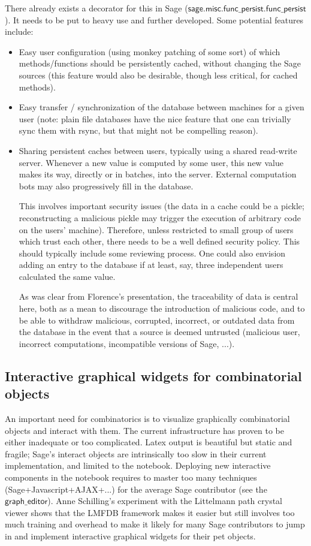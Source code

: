 \documentclass{article}
\newcommand{\sagecommand}[1]{$\textsf{#1}$}
\begin{document}
There already exists a decorator for this in Sage
(\sagecommand{sage.misc.func\_persist.func\_persist}). It needs to be put to heavy use
and further developed. Some potential features include:
\begin{itemize}
\item Easy user configuration (using monkey patching of some sort) of
  which methods/functions should be persistently cached, without
  changing the Sage sources (this feature would also be desirable,
  though less critical, for cached methods).
\item Easy transfer / synchronization of the database between machines
  for a given user (note: plain file databases have the nice feature
  that one can trivially sync them with rsync, but that might not be
  compelling reason).
\item Sharing persistent caches between users, typically using a
  shared read-write server. Whenever a new value is computed by some
  user, this new value makes its way, directly or in batches, into the
  server. External computation bots may also progressively fill in the
  database.

  This involves important security issues (the data in a cache could be a
  pickle; reconstructing a malicious pickle may trigger the execution
  of arbitrary code on the users' machine). Therefore, unless
  restricted to small group of users which trust each other, there
  needs to be a well defined security policy. This should typically
  include some reviewing process. One could also envision adding an
  entry to the database if at least, say, three independent users
  calculated the same value.

  As was clear from Florence's presentation, the traceability of data
  is central here, both as a mean to discourage the introduction of
  malicious code, and to be able to withdraw malicious, corrupted,
  incorrect, or outdated data from the database in the event that a
  source is deemed untrusted (malicious user, incorrect computations,
  incompatible versions of Sage, ...).
\end{itemize}

\subsection{Interactive graphical widgets for combinatorial objects}

An important need for combinatorics is to visualize graphically
combinatorial objects and interact with them. The current
infrastructure has proven to be either inadequate or too complicated. 
Latex output is beautiful but static and fragile; Sage's interact
objects are intrinsically too slow in their current implementation,
and limited to the notebook. Deploying new interactive components in
the notebook requires to master too many techniques
(Sage+Javascript+AJAX+...) for the average Sage contributor (see the
\sagecommand{graph\_editor}). Anne Schilling's experiment with the Littelmann path
crystal viewer shows that the LMFDB framework makes it easier but
still involves too much training and overhead to make it likely for
many Sage contributors to jump in and implement interactive graphical
widgets for their pet objects.
\end{document}
